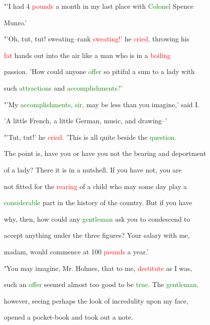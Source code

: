  "'I had 4 \textcolor{red}{pounds} a month in my last place with \textcolor{green}{Colonel} Spence

 Munro.'



 "'Oh, tut, tut! sweating--rank \textcolor{red}{sweating!'} he \textcolor{red}{cried,} throwing his

 \textcolor{red}{fat} hands out into the air like a man who is in a \textcolor{red}{boiling}

 \textcolor{BurntOrange}{passion.} 'How could anyone \textcolor{green}{offer} so pitiful a sum to a lady with

 such \textcolor{green}{attractions} and \textcolor{green}{accomplishments?'}



 "'My \textcolor{green}{accomplishments,} \textcolor{green}{sir,} may be less than you imagine,' said I.

 'A little French, a little German, \textcolor{BurntOrange}{music,} and drawing--'



 "'Tut, tut!' he \textcolor{red}{cried.} 'This is all quite beside the \textcolor{green}{question.}

 The point is, have you or have you not the bearing and deportment

 of a lady? There it is in a nutshell. If you have not, you are

 not fitted for the \textcolor{red}{rearing} of a \textcolor{BurntOrange}{child} who may some day play a

 \textcolor{green}{considerable} part in the history of the country. But if you have

 why, then, how could any \textcolor{green}{gentleman} ask you to condescend to

 accept anything under the three figures? Your \textcolor{BurntOrange}{salary} with me,

 madam, would commence at 100 \textcolor{red}{pounds} a year.'



 "You may imagine, Mr. Holmes, that to me, \textcolor{red}{destitute} as I was,

 such an \textcolor{green}{offer} seemed almost too \textcolor{BurntOrange}{good} to be \textcolor{green}{true.} The \textcolor{green}{gentleman,}

 however, seeing perhaps the look of incredulity upon my face,

 opened a pocket-book and took out a note.



